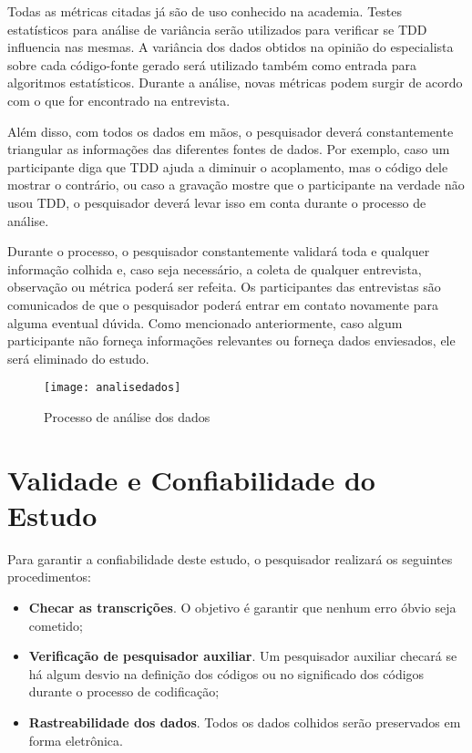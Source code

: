 Todas as métricas citadas já são de uso conhecido na academia. 
Testes estatísticos para análise de variância serão utilizados
para verificar se TDD influencia nas mesmas.
A variância dos dados obtidos na opinião do especialista sobre cada código-fonte gerado
será utilizado também como entrada para algoritmos estatísticos. 
Durante a análise, novas
métricas podem surgir de acordo com o que for encontrado na entrevista.

Além disso, com todos os dados em mãos, o pesquisador deverá constantemente triangular
as informações das diferentes fontes de dados. Por exemplo, caso um participante diga
que TDD ajuda a diminuir o acoplamento, mas o código dele mostrar o contrário, ou caso
a gravação mostre que o participante na verdade não usou TDD, o pesquisador
deverá levar isso em conta durante o processo de análise.

Durante o processo, o pesquisador constantemente validará toda e qualquer
informação colhida e, caso seja necessário, a coleta de qualquer entrevista,
observação ou métrica poderá ser refeita. Os participantes das entrevistas
são comunicados de que o pesquisador poderá entrar em contato
novamente para alguma eventual dúvida.
Como mencionado anteriormente, caso algum participante não forneça informações
relevantes ou forneça dados enviesados, ele será eliminado do estudo.

\begin{figure}
  \centering
  \texttt{[image: analisedados]}
  \caption{Processo de análise dos dados}
  \label{fig:analise-dados}
\end{figure}

\section{Validade e Confiabilidade do Estudo}
\label{sec:planejamento-validacao}

Para garantir a confiabilidade deste estudo, o pesquisador realizará os
seguintes procedimentos:

\begin{itemize}
	\item \textbf{Checar as transcrições}. O objetivo é garantir que nenhum erro
	óbvio seja cometido;

	\item \textbf{Verificação de pesquisador auxiliar}. Um pesquisador auxiliar
	checará se há algum desvio na definição dos códigos ou no significado dos códigos 
	durante o processo de codificação;
	
	\item \textbf{Rastreabilidade dos dados}. Todos os dados colhidos serão
	preservados em forma eletrônica.

\end{itemize}

